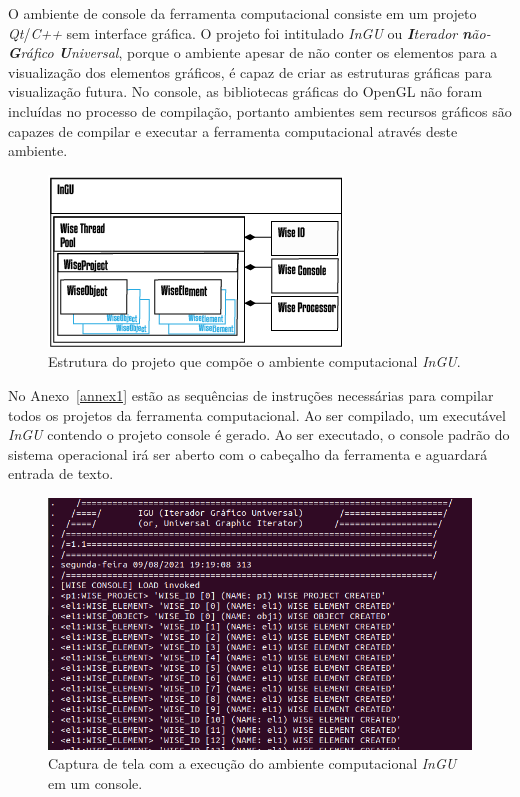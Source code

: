 O ambiente de console da ferramenta computacional consiste em um projeto \textit{Qt}/\textit{C++} sem interface gráfica. O projeto foi intitulado \textit{InGU} ou \textit{\textbf{I}terador \textbf{n}ão-\textbf{G}ráfico \textbf{U}niversal}, porque o ambiente apesar de não conter os elementos para a visualização dos elementos gráficos, é capaz de criar as estruturas gráficas para visualização futura.  No console, as bibliotecas gráficas do OpenGL não foram incluídas no processo de compilação, portanto ambientes sem recursos gráficos são capazes de compilar e executar a ferramenta computacional através deste ambiente.

\begin{figure}[!htbp]
	\centering
	\includegraphics[width=\linewidth]{Figures/InGU.png}
	\caption{Estrutura do projeto que compõe o ambiente computacional \textit{InGU}.}
	\label{fig10:console}
\end{figure}

No Anexo~\ref{annex1} estão as sequências de instruções necessárias para compilar todos os projetos da ferramenta computacional. Ao ser compilado, um executável \textit{InGU} contendo o projeto console é gerado. Ao ser executado, o console padrão do sistema operacional irá ser aberto com o cabeçalho da ferramenta e aguardará entrada de texto.

\begin{figure}[!htbp]
	\centering
	\includegraphics[scale=0.45]{Figures/InGU_console.png}
	\caption{Captura de tela com a execução do ambiente computacional \textit{InGU} em um console.}
	\label{fig11:ajuda}
\end{figure}

